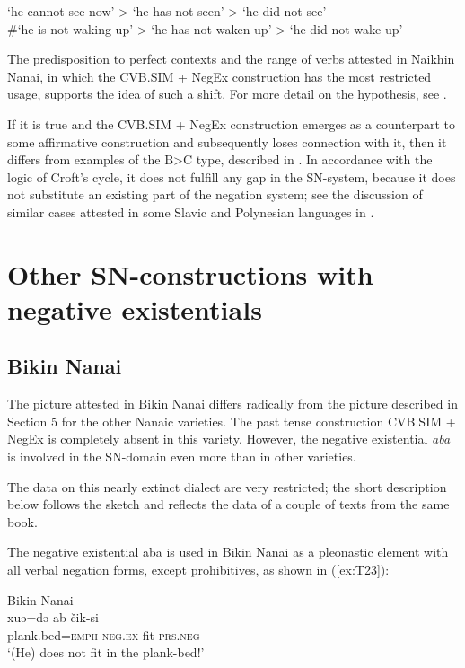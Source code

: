 \documentclass[output=paper]{langscibook}
\begin{document}
\begin{exe}
    \ex ‘he cannot see now’ > ‘he has not seen’ > ‘he did not see’\\
    \#‘he is not waking up’ > ‘he has not waken up’ > ‘he did not wake up’
\end{exe}

The predisposition to perfect contexts and the range of verbs attested in Naikhin Nanai, in which the CVB.SIM + NegEx construction has the most restricted usage, supports the idea of such a shift. For more detail on the hypothesis, see \citet{oskolskaya2017a}.

If it is true and the CVB.SIM + NegEx construction emerges as a counterpart to some affirmative construction and subsequently loses connection with it, then it differs from examples of the B>C type, described in \citet{Croft1991}. In accordance with the logic of Croft’s cycle, it does not fulfill any gap in the SN-system, because it does not substitute an existing part of the negation system; see the discussion of similar cases attested in some Slavic and Polynesian languages in \citet{Veselinova2014, Veselinova2016}.

\section{Other SN-constructions with negative existentials}\label{sec:T6}

\subsection{Bikin Nanai}\label{sec:T6.1}

The picture attested in Bikin Nanai differs radically from the picture described in Section 5 for the other Nanaic varieties. The past tense construction CVB.SIM + NegEx is completely absent in this variety. However, the negative existential \textit{aba} is involved in the SN-domain even more than in other varieties.

The data on this nearly extinct dialect are very restricted; the short description below follows the sketch \citep{sem1976a} and reflects the data of a couple of texts from the same book.

The negative existential aba is used in Bikin Nanai as a pleonastic element with all verbal negation forms, except prohibitives, as shown in (\ref{ex:T23}):

\ea Bikin Nanai \label{ex:T23}\\
	\gll xuə=də	ab	čik-si\\
	plank.bed=\textsc{emph}	\textsc{neg.ex}	fit-\textsc{prs.neg}\\
	\glt `(He) does not fit in the plank-bed!' \citep[text 2]{sem1976a}
\z
\end{document}
